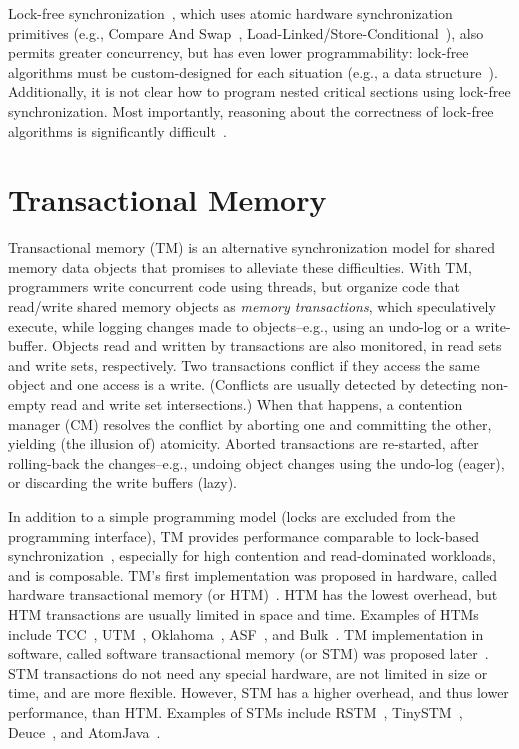Lock-free synchronization~\cite{herlihy2008art}, 
which uses atomic hardware synchronization primitives (e.g., Compare And Swap~\cite{CAS64IA32, CASitanium}, Load-Linked/Store-Conditional~\cite{LL:CS:Sites:1993:AAA:151220.151226}),
also permits greater concurrency, but has even lower programmability: lock-free algorithms must be custom-designed for each situation (e.g., a data structure~\cite{lockfreeLLmichael2002high,lockfreeSL,lockfreeBSTfraser2004practical,HopscotchHashing,KarySearchTreesbrown2011non}). Additionally, it is not clear how to program nested critical sections using lock-free synchronization. Most importantly, reasoning about the correctness of lock-free algorithms is significantly difficult~\cite{herlihy2008art}. 

\section{Transactional Memory}

Transactional memory (TM) is an alternative synchronization model for shared memory data objects that promises to alleviate these difficulties.  With TM, programmers write concurrent code using threads, but organize code that read/write shared memory objects as \emph{memory transactions}, which speculatively execute, while logging changes made to objects--e.g., using an undo-log or a write-buffer. Objects read and written by transactions are also monitored, in read sets and write sets, respectively. Two transactions conflict if they access the same object and one access is a write. (Conflicts are usually detected by detecting non-empty read and write set intersections.) When that happens, a contention manager (CM) resolves the conflict by aborting one and committing the other, yielding (the illusion of) atomicity. Aborted transactions are re-started, after rolling-back the changes--e.g., undoing object changes using the undo-log (eager), or discarding the write buffers (lazy). 

In addition to a simple programming model (locks are excluded from the programming interface), TM provides performance comparable to lock-based synchronization~\cite{Saha:2006:MHP:1122971.1123001}, especially for high contention and read-dominated workloads, and is composable. TM's first implementation was proposed in hardware, called hardware transactional memory (or HTM)~\cite{Herlihy:1993:TMA:165123.165164}. HTM has the lowest overhead, but HTM transactions are usually limited in space and time. Examples of HTMs include TCC~\cite{ham04},
UTM~\cite{UTM1385954}, Oklahoma~\cite{Oklahoma260295}, ASF~\cite{AMDprocHTMchristie2010evaluation}, and Bulk~\cite{BulkCeze:2006:BDS:1135775.1136506}. TM implementation in software, called software transactional memory (or STM) was proposed later~\cite{sha95}. STM transactions do not need any special hardware, are not
limited in size or time, and are more flexible. However, STM has a higher overhead, and thus lower performance, than HTM. Examples of STMs include
RSTM~\cite{RSTM}, TinySTM~\cite{TinySTM}, Deuce~\cite{Deucekorland2010noninvasive},
and AtomJava~\cite{AtomJavahindman2006atomicity}.

